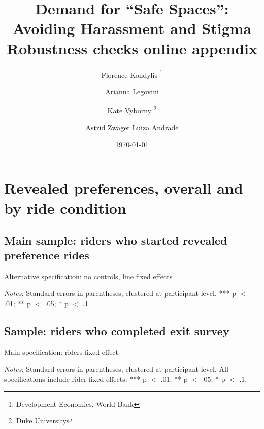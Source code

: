 \documentclass[12pt]{article}
\newcommand{\footremember}[2]{%
	\footnote{#2}
	\newcounter{#1}
	\setcounter{#1}{\value{footnote}}%
}
\newcommand{\footrecall}[1]{%
	\footnotemark[\value{#1}]%
}
\begin{document}
\title{Demand for ``Safe Spaces'': Avoiding Harassment and Stigma \\
Robustness checks online appendix}
\author{%
	Florence Kondylis\footremember{wb}{Development Economics, World Bank}%
	\and Arianna Legovini\footrecall{wb}%
	\and Kate Vyborny\footremember{duke}{Duke University}%
	\and Astrid Zwager\footrecall{wb} \hspace{1.2cm} Luiza Andrade\footrecall{wb}%
}

\date{\today}
\maketitle

\tableofcontents

\singlespacing

\section{Revealed preferences, overall and by ride condition}

\subsection{Main sample: riders who started revealed preference rides}

\begin{table}[H]
	\centering
	\caption{Alternative specification: no controls, line fixed effects }
	\begin{adjustbox}{max width = .5\textwidth}
		\begin{threeparttable}
			
			\begin{tablenotes}
				\item  \footnotesize\textit{Notes:} Standard errors in parentheses, clustered at participant level. *** p $<$ .01; ** p $<$ .05; * p $<$ .1.
			\end{tablenotes}
		\end{threeparttable}
	\end{adjustbox}
\end{table}

\subsection{Sample: riders who completed exit survey}

\begin{table}[H]
	\centering
	\caption{Main specification: riders fixed effect}
	\begin{adjustbox}{max width = .5\textwidth}
		\begin{threeparttable}
			
			\begin{tablenotes}
				\item  \footnotesize\textit{Notes:} Standard errors in parentheses, clustered at participant level. All specifications include rider fixed effects. *** p $<$ .01; ** p $<$ .05; * p $<$ .1.
			\end{tablenotes}
		\end{threeparttable}
	\end{adjustbox}
\end{table}
\end{document}
